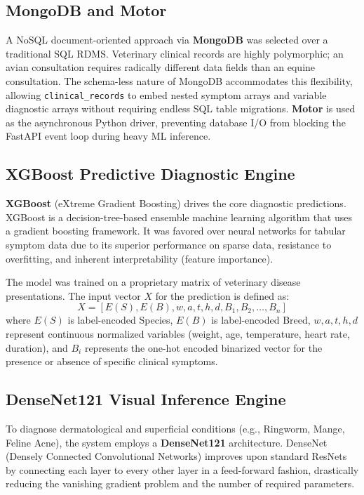 \documentclass[a4paper,12pt]{report}
\begin{document}
\subsection{MongoDB and Motor}

A NoSQL document-oriented approach via \textbf{MongoDB} was selected over a traditional SQL RDMS. Veterinary clinical records are highly polymorphic; an avian consultation requires radically different data fields than an equine consultation. The schema-less nature of MongoDB accommodates this flexibility, allowing \texttt{clinical\_records} to embed nested symptom arrays and variable diagnostic arrays without requiring endless SQL table migrations. \textbf{Motor} is used as the asynchronous Python driver, preventing database I/O from blocking the FastAPI event loop during heavy ML inference.

\subsection{XGBoost Predictive Diagnostic Engine}

\textbf{XGBoost} (eXtreme Gradient Boosting) drives the core diagnostic predictions. XGBoost is a decision-tree-based ensemble machine learning algorithm that uses a gradient boosting framework. It was favored over neural networks for tabular symptom data due to its superior performance on sparse data, resistance to overfitting, and inherent interpretability (feature importance).

The model was trained on a proprietary matrix of veterinary disease presentations. The input vector $X$ for the prediction is defined as:
\begin{equation}
X = [E(S), E(B), w, a, t, h, d, B_1, B_2, \dots, B_n]
\label{eq:xgboost_vector}
\end{equation}
where $E(S)$ is label-encoded Species, $E(B)$ is label-encoded Breed, $w, a, t, h, d$ represent continuous normalized variables (weight, age, temperature, heart rate, duration), and $B_i$ represents the one-hot encoded binarized vector for the presence or absence of specific clinical symptoms.

\subsection{DenseNet121 Visual Inference Engine}

To diagnose dermatological and superficial conditions (e.g., Ringworm, Mange, Feline Acne), the system employs a \textbf{DenseNet121} architecture. DenseNet (Densely Connected Convolutional Networks) improves upon standard ResNets by connecting each layer to every other layer in a feed-forward fashion, drastically reducing the vanishing gradient problem and the number of required parameters.
\end{document}
